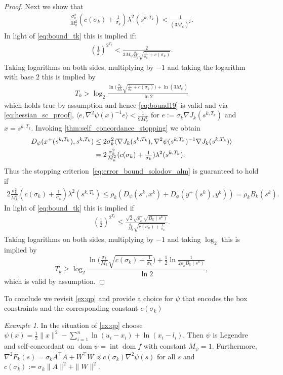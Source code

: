 \documentclass[11pt,onecolumn]{article}
\DeclareMathOperator{\dom}{dom}
\DeclareMathOperator{\intr}{int}
\theoremstyle{remark}
\newtheorem{example}[example]{Example}
\begin{document}
\begin{proof}
Next we show that
\begin{align} \label{eq:bound19}
\tfrac{\sigma_k^2}{M_k^2}(c(\sigma_k) + \tfrac{1}{\sigma_k}) \lambda^2(s^{k,T_k}) < \tfrac{1}{(3M_\psi)^2}.
\end{align}
In light of \cref{eq:bound_tk} this is implied if:
\begin{align}
(\tfrac{1}{2})^{2^{T_k}} < \frac{2}{3M_\psi \tfrac{\sigma_k}{M_k} \sqrt{\tfrac{1}{\sigma_k} + c(\sigma_k)}}.
\end{align}
Taking logarithms on both sides, multiplying by $-1$ and taking the logarithm with base $2$ this is implied by
\begin{align}
T_k  > \log_2 \frac{\ln \Big( \tfrac{\sigma_k}{M_k} \sqrt{\tfrac{1}{\sigma_k} + c(\sigma_k)} \Big) +\ln (3M_\psi)}{\ln 2}
\end{align}
which holds true by assumption and hence \cref{eq:bound19} is valid and via \cref{eq:hessian_sc_proof}, $\langle e, \nabla^2 \psi(x)^{-1} e \rangle < \tfrac{1}{9M_\psi^2}$ for $e:=\sigma_k \nabla J_k(s^{k,T_k})$ and $x=s^{k,T_k}$. Invoking \cref{thm:self_concordance_stopping} we obtain
\begin{align}
D_\psi(x^{+}(s^{k,T_k}), s^{k,T_k})&\leq 2\sigma_k^2 \langle \nabla J_k(s^{k,T_k}), \nabla^2 \psi(s^{k,T_k})^{-1} \nabla J_k(s^{k,T_k}) \rangle \notag \\
&=2\tfrac{\sigma_k^2}{M_k^2}(c(\sigma_k) + \tfrac{1}{\sigma_k})\lambda^2(s^{k,T_k}).
\end{align}
Thus the stopping criterion~\cref{eq:error_bound_solodov_alm} is guaranteed to hold if
\begin{align}
2\tfrac{\sigma_k^2}{M_k^2}(c(\sigma_k) + \tfrac{1}{\sigma_k})\lambda^2(s^{k,T_k}) \leq \rho_k(D_\psi(s^k, x^k) + D_\phi(y^{+}(s^k), y^k)) = \rho_k B_k(s^k).
\end{align}
In light of \cref{eq:bound_tk} this is implied if
\begin{align}
(\tfrac{1}{2})^{2^{T_k}} \leq \frac{\sqrt{2} \sqrt{\rho_k}\sqrt{ B_k(s^k) }}{\tfrac{\sigma_k}{M_k} \sqrt{c(\sigma_k) + \tfrac{1}{\sigma_k}}}.
\end{align}
Taking logarithms on both sides, multiplying by $-1$ and taking $\log_2$ this is implied by
\[
T_k \geq\log_2 \frac{\ln \Big(\tfrac{\sigma_k}{M_k} \sqrt{c(\sigma_k) + \tfrac{1}{\sigma_k}} \Big) + \tfrac{1}{2}\ln\tfrac{1}{2 \rho_k B_k(s^k)}}{\ln 2},
\]
which is valid by assumption.
\end{proof}

To conclude we revisit \cref{ex:qp} and provide a choice for $\psi$ that encodes the box constraints and the corresponding constant $c(\sigma_k)$
\begin{example}
In the situation of \cref{ex:qp} choose $\psi(x)=\frac{1}{2}\|x\|^2-\sum_{i=1}^n \ln(u_i-x_i) + \ln(x_i-l_i)$. Then $\psi$ is Legendre and self-concordant on $\dom \psi = \intr \dom f$ with constant $M_\psi=1$. Furthermore, $\nabla^2 F_k(s)=\sigma_k A^\top A + W^\top W \preceq c(\sigma_k) \nabla^2 \psi(s)$ for all $s$ and $c(\sigma_k):=\sigma_k \|A\|^2+\|W\|^2$.
\end{example}
\end{document}
